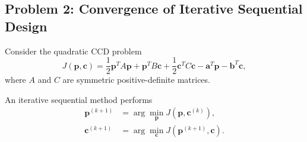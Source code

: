 \subsection*{Problem 2: Convergence of Iterative Sequential Design}

Consider the quadratic CCD problem
\begin{equation}
J(\mathbf{p},\mathbf{c})
=
\frac{1}{2}\mathbf{p}^TA\mathbf{p}
+
\mathbf{p}^TB\mathbf{c}
+
\frac{1}{2}\mathbf{c}^TC\mathbf{c}
-
\mathbf{a}^T\mathbf{p}
-
\mathbf{b}^T\mathbf{c},
\end{equation}
where $A$ and $C$ are symmetric positive-definite matrices.

An iterative sequential method performs
\begin{align}
\mathbf{p}^{(k+1)}
&=
\arg\min_{\mathbf{p}}
J\left(\mathbf{p},\mathbf{c}^{(k)}\right),
\\
\mathbf{c}^{(k+1)}
&=
\arg\min_{\mathbf{c}}
J\left(\mathbf{p}^{(k+1)},\mathbf{c}\right).
\end{align}

